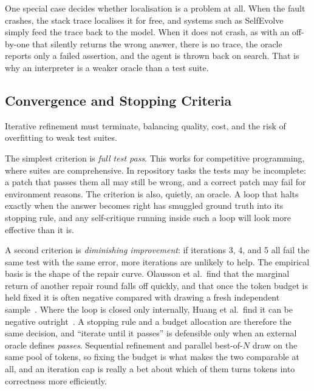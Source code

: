 \documentclass[
  english,        %
  font=times,     %
  twocolumn,      %
]{tumarticle}
\begin{document}
One special case decides whether localisation is a problem at all. When the fault
crashes, the stack trace localises it for free, and systems such as
SelfEvolve~\cite{jiang2023selfevolve} simply feed the trace back to the model.
When it does not crash, as with an off-by-one that silently returns the wrong
answer, there is no trace, the oracle reports only a failed assertion, and the
agent is thrown back on search. That is why an interpreter is a weaker oracle than
a test suite.

\subsection{Convergence and Stopping Criteria}
\label{sec:convergence}

Iterative refinement must terminate, balancing quality, cost, and the risk of
overfitting to weak test suites.

The simplest criterion is \emph{full test pass}. This works for competitive
programming, where suites are comprehensive. In repository tasks the tests may be
incomplete: a patch that passes them all may still be wrong, and a correct patch
may fail for environment reasons. The criterion is also, quietly, an oracle. A
loop that halts exactly when the answer becomes right has smuggled ground truth
into its stopping rule, and any self-critique running inside such a loop will look
more effective than it is.

A second criterion is \emph{diminishing improvement}: if iterations 3, 4, and 5
all fail the same test with the same error, more iterations are unlikely to help.
The empirical basis is the shape of the repair curve. Olausson et al.\ find that
the marginal return of another repair round falls off quickly, and that once the
token budget is held fixed it is often negative compared with drawing a fresh
independent sample~\cite{olausson2024selfrepair}. Where the loop is closed only
internally, Huang et al.\ find it can be negative outright~\cite{huang2024selfcorrect}.
A stopping rule and a budget allocation are therefore the same decision, and
``iterate until it passes'' is defensible only when an external oracle defines
\emph{passes}. Sequential refinement and parallel best-of-$N$ draw on the same
pool of tokens, so fixing the budget is what makes the two comparable at all, and
an iteration cap is really a bet about which of them turns tokens into correctness
more efficiently.
\end{document}
